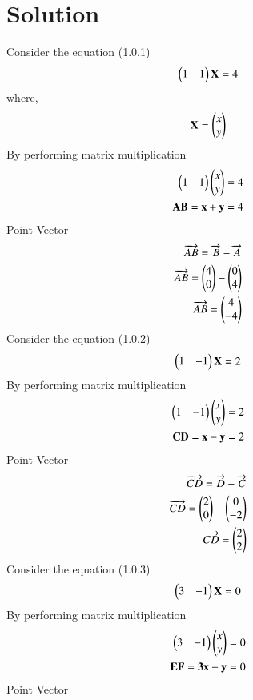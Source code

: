 \documentclass[journal,12pt,twocolumn]{IEEEtran}
\begin{document}
\section{Solution}
Consider the equation (1.0.1)
\begin{align}
\begin{pmatrix}1& 1\end{pmatrix}\mathbf{X}=4
\end{align}
where,
\begin{align}
\mathbf{X}= \begin{pmatrix}x\\y\end{pmatrix}
\end{align}
By performing matrix multiplication
\begin{align}
\begin{pmatrix}1&1\end{pmatrix}\begin{pmatrix}x\\y\end{pmatrix}=4\\
\mathbf{AB}=\mathbf{x}+\mathbf{y}=4
\end{align}
Point Vector
\begin{align}
\overrightarrow{AB} =\overrightarrow{B}-\overrightarrow{A}\\
\overrightarrow{AB} =\begin{pmatrix}4\\0\end{pmatrix}-\begin{pmatrix}0\\4\end{pmatrix}\\
\overrightarrow{AB} =\begin{pmatrix}4\\-4\end{pmatrix}
\end{align}
Consider the equation (1.0.2)
\begin{align}
\begin{pmatrix}1& -1\end{pmatrix}\mathbf{X}=2
\end{align}
By performing matrix multiplication
\begin{align}
\begin{pmatrix}1&-1\end{pmatrix}\begin{pmatrix}x\\y\end{pmatrix}=2\\
\mathbf{CD}=\mathbf{x}-\mathbf{y}=2
\end{align}
Point Vector
\begin{align}
\overrightarrow{CD} =\overrightarrow{D}-\overrightarrow{C}\\
\overrightarrow{CD} =\begin{pmatrix}2\\0\end{pmatrix}-\begin{pmatrix}0\\-2\end{pmatrix}\\
\overrightarrow{CD} =\begin{pmatrix}2\\2\end{pmatrix}
\end{align}
Consider the equation (1.0.3)
\begin{align}
\begin{pmatrix}3& -1\end{pmatrix}\mathbf{X}=0
\end{align}
By performing matrix multiplication
\begin{align}
\begin{pmatrix}3&-1\end{pmatrix}\begin{pmatrix}x\\y\end{pmatrix}=0\\
\mathbf{EF}=\mathbf{3x}-\mathbf{y}=0
\end{align}
Point Vector
\end{document}
